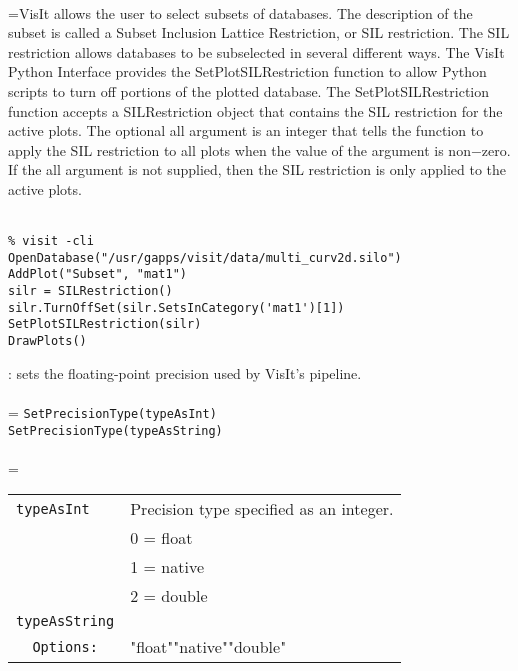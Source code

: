 \documentclass[10pt,a4paper]{report}
\begin{document}
 \\ 
\hangindent=\parindent VisIt allows the user to select subsets of databases. The description of the subset is called a Subset Inclusion Lattice Restriction, or SIL restriction. The SIL restriction allows databases to be subselected in several different ways. The VisIt Python Interface provides the SetPlotSILRestriction function to allow Python scripts to turn off portions of the plotted database. The SetPlotSILRestriction function accepts a SILRestriction object that contains the SIL restriction for the active plots. The optional all argument is an integer that tells the function to apply the SIL restriction to all plots when the value of the argument is non$-$zero. If the all argument is not supplied, then the SIL restriction is only applied to the active plots. \\[-3mm] 

\\[-6mm]
\begin{verbatim}% visit -cli
OpenDatabase("/usr/gapps/visit/data/multi_curv2d.silo")
AddPlot("Subset", "mat1")
silr = SILRestriction()
silr.TurnOffSet(silr.SetsInCategory('mat1')[1])
SetPlotSILRestriction(silr)
DrawPlots()
\end{verbatim}
\newpage


{}
: sets the floating-point precision used by VisIt's pipeline.\\[-3mm]

 \\ 
\hangindent=\parindent 
\verb!SetPrecisionType(typeAsInt)!\\ 
\verb!SetPrecisionType(typeAsString)!\\ [-3mm]

 \\ 
\hangindent=\parindent 
\begin{tabular}{ll}
\verb!typeAsInt! & Precision type specified as an integer. \\
\verb!! & 0 = float \\
\verb!! & 1 = native \\
\verb!! & 2 = double \\
\verb!typeAsString! &  \\
\verb!  Options:! & "float""native""double" \\
\end{tabular} \\[-2mm]
\end{document}
